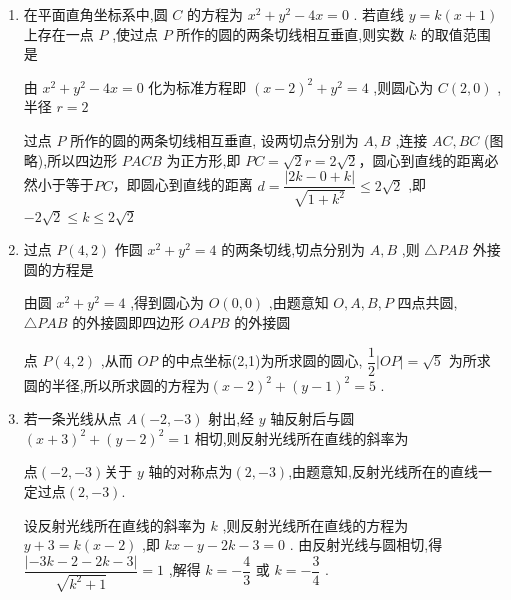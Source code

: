 \begin{enumerate}
\begin{jieda}
\begin{enumerate}
\begin{dingautolist}{172}
                故切线方程为 $y - 1 = \dfrac{3}{4}\left( {x - 3}\right)$，即 ${3x} - {4y} - 5 = 0$ .
            \end{dingautolist}
            综上,过点 $M$ 的圆 $C$ 的切线方程为 $x - 3 = 0$ 或 ${3x} - {4y} - 5 = 0$ .
        \end{enumerate}
    \end{jieda}
    \item 在平面直角坐标系中,圆 $C$ 的方程为 ${x}^{2} + {y}^{2} - {4x} = 0$ . 若直线 $y = k\left( {x + 1}\right)$ 上存在一点 $P$ ,使过点 $P$ 所作的圆的两条切线相互垂直,则实数 $k$ 的取值范围是
    \begin{jieda}
        由 ${x}^{2} + {y}^{2} - {4x} = 0$ 化为标准方程即 ${\left( x - 2\right) }^{2} + {y}^{2} = 4$ ,则圆心为 $C\left( {2,0}\right)$ ,半径 $r = 2$ 
        
        过点 $P$ 所作的圆的两条切线相互垂直, 设两切点分别为 $A,B$ ,连接 ${AC},{BC}$ (图略),所以四边形 ${PACB}$ 为正方形,即 ${PC} = \sqrt{2}r = 2\sqrt{2}$，圆心到直线的距离必然小于等于$PC$，即圆心到直线的距离 $d = \dfrac{\left| 2k - 0 + k\right| }{\sqrt{1 + {k}^{2}}} \leq  2\sqrt{2}$ ,即 $- 2\sqrt{2} \leq  k \leq  2\sqrt{2}$
    \end{jieda}
    
    \item 过点 $P\left( {4,2}\right)$ 作圆 ${x}^{2} + {y}^{2} = 4$ 的两条切线,切点分别为 $A,B$ ,则 $\bigtriangleup  {PAB}$ 外接圆的方程是
    \begin{jieda}
        由圆 ${x}^{2} + {y}^{2} = 4$ ,得到圆心为 $O\left( {0,0}\right)$ ,由题意知 $O,A,B,P$ 四点共圆, $\bigtriangleup {PAB}$ 的外接圆即四边形 ${OAPB}$ 的外接圆
        
        点 $P\left( {4,2}\right)$ ,从而 ${OP}$ 的中点坐标(2,1)为所求圆的圆心, $\dfrac{1}{2}\left| {OP}\right|  = \sqrt{5}$ 为所求圆的半径,所以所求圆的方程为${\left( x - 2\right) }^{2} + {\left( y - 1\right) }^{2} = 5$ .
    \end{jieda}
    \item 若一条光线从点 $A\left( {-2, - 3}\right)$ 射出,经 $y$ 轴反射后与圆 ${\left( x + 3\right) }^{2} + {\left( y - 2\right) }^{2} = 1$ 相切,则反射光线所在直线的斜率为
    \begin{jieda}
        点$(-2, - 3)$关于 $y$ 轴的对称点为$(2, - 3)$,由题意知,反射光线所在的直线一定过点$(2, - 3)$. 
        
        设反射光线所在直线的斜率为 $k$ ,则反射光线所在直线的方程为 $y + 3 = k\left( {x - 2}\right)$ ,即 ${kx} - y - {2k} - 3 = 0$ . 由反射光线与圆相切,得 $\dfrac{\left| -3k - 2 - 2k - 3\right| }{\sqrt{{k}^{2} + 1}} = 1$ ,解得 $k =  - \dfrac{4}{3}$ 或 $k =  - \dfrac{3}{4}$ .
    \end{jieda}


\end{enumerate}
